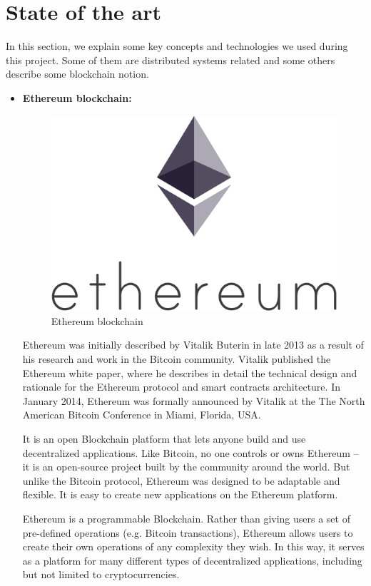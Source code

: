 \section{State of the art}
    In this section, we explain some key concepts and technologies we used during this project. Some of them
    are distributed systems related and some others describe some blockchain notion.
    \begin{itemize}
        \item \textbf{Ethereum blockchain:}

        \begin{figure}[!h]\centering
            \includegraphics[width=.3\columnwidth]{3-State-of-the-art/figs/ethereum.png}
            \caption{Ethereum blockchain}
        \end{figure}
        
        Ethereum\cite{ethereum} was initially described by Vitalik Buterin\cite{v-buterin} in late 2013
        as a result of his research and work in the Bitcoin community. Vitalik published the Ethereum
        white paper, where he describes in detail the technical design and rationale for the Ethereum
        protocol and smart contracts architecture. In January 2014, Ethereum was formally announced by
        Vitalik at the The North American Bitcoin Conference in Miami, Florida, USA.

        It is an open Blockchain platform that lets anyone build and use decentralized
        applications. Like Bitcoin, no one controls or owns Ethereum – it is an open-source project built
        by the community around the world. But unlike the Bitcoin protocol, Ethereum was designed to be
        adaptable and flexible. It is easy to create new applications on the Ethereum platform.
        
        Ethereum is a programmable Blockchain. Rather than giving users a set of pre-defined operations
        (e.g. Bitcoin transactions), Ethereum allows users to create their own operations of any complexity
        they wish. In this way, it serves as a platform for many different types of decentralized applications,
        including but not limited to cryptocurrencies.
        

\end{itemize}
